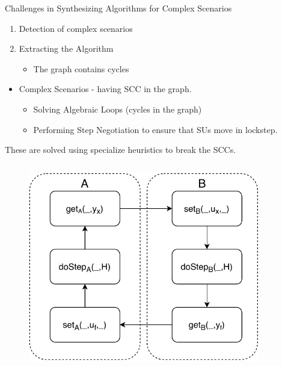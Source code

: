 \documentclass{beamer}
\begin{document}
\begin{frame}{Challenges in Synthesizing Algorithms for Complex Scenarios}
    \begin{enumerate}
        \item Detection of complex scenarios
        \item Extracting the Algorithm
        \begin{itemize}
            \item The graph contains cycles
        \end{itemize}
    \end{enumerate}
    \begin{itemize}
        \item Complex Scenarios - having SCC in the graph.
        \begin{itemize}
            \item Solving Algebraic Loops (cycles in the graph)
            \item Performing Step Negotiation to ensure that SUs move in lockstep.
        \end{itemize}
    \end{itemize}
    These are solved using specialize heuristics to break the SCCs.
    \begin{columns}[T] 
        \begin{column}{.48\textwidth}
            \begin{figure}    
                \includegraphics[width=0.9\textwidth]{images/reactive_step_graph.pdf}
            \end{figure}  
        \end{column}
    \hfill%

\end{columns}
\end{frame}
\end{document}
